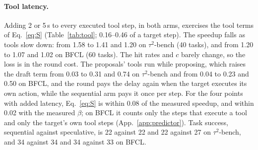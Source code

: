 \paragraph{Tool latency.}

Adding 2 or 5\,s to every executed tool step, in both arms, exercises the tool terms of Eq.~\ref{eq:S}
(Table~\ref{tab:tool}; 0.16--0.46 of a target step). The speedup falls as tools slow down: from 1.58\xx{} to
1.41\xx{} and 1.20\xx{} on $\tau^2$-bench (40 tasks), and from 1.20\xx{} to 1.07\xx{} and 1.02\xx{} on BFCL
(60 tasks). The hit rates and $c$ barely change, so the loss is in the round cost. The proposals' tools run
while proposing, which raises the draft term from 0.03 to 0.31 and 0.74 on $\tau^2$-bench and from 0.04 to
0.23 and 0.50 on BFCL, and the round pays the delay again when the target executes its own action, while the
sequential arm pays it once per step. For the four points with added latency, Eq.~\ref{eq:S} is within 0.08
of the measured speedup, and within 0.02 with the measured $\beta$; on BFCL it counts only the steps that
execute a tool and only the target's own tool steps (App.~\ref{app:predictor}). Task success, sequential against
speculative, is 22 against 22 and 22 against 27 on $\tau^2$-bench, and 34 against 34 and 34 against 33 on BFCL.

